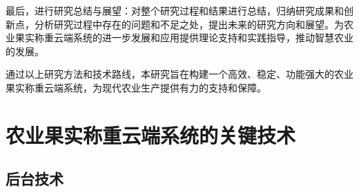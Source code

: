 \documentclass{xduugthesis}
\begin{document}
最后，进行研究总结与展望：对整个研究过程和结果进行总结，归纳研究成果和创新点，分析研究过程中存在的问题和不足之处，提出未来的研究方向和展望。为农业果实称重云端系统的进一步发展和应用提供理论支持和实践指导，推动智慧农业的发展。

通过以上研究方法和技术路线，本研究旨在构建一个高效、稳定、功能强大的农业果实称重云端系统，为现代农业生产提供有力的支持和保障。

\chapter{农业果实称重云端系统的关键技术}

\section{后台技术}
\end{document}
